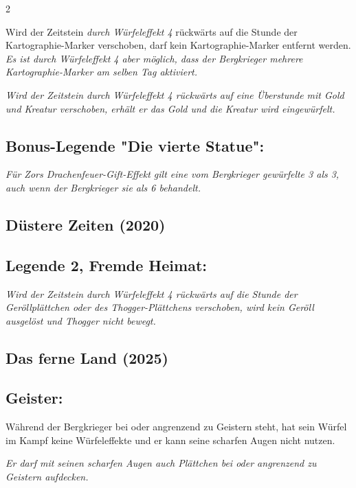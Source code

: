 \documentclass[10pt, a4paper, oneside]{book}
\newcommand{\fan}[1]{\textit{#1}}
\begin{document}
\begin{multicols*}{2}
\begin{bgcolor}[color-AG]
Wird der Zeitstein \fan{durch Würfeleffekt 4} rückwärts auf die Stunde der Kartographie-Marker verschoben, darf kein Kartographie-Marker entfernt werden. 
\supercite{AG:Begleitheft}
\fan{Es ist durch Würfeleffekt 4 aber möglich, dass der Bergkrieger mehrere Kartographie-Marker am selben Tag aktiviert.}

\fan{Wird der Zeitstein durch Würfeleffekt 4 rückwärts auf eine Überstunde mit Gold und Kreatur verschoben, erhält er das Gold und die Kreatur wird eingewürfelt.}


\subsection{Bonus-Legende "Die vierte Statue":}

\fan{Für Zors Drachenfeuer-Gift-Effekt gilt eine vom Bergkrieger gewürfelte 3 als 3, auch wenn der Bergkrieger sie als 6 behandelt.}

\end{bgcolor}




\columnbreak




\begin{bgcolor}[color-DZ]
\section{Düstere Zeiten (2020)}

\subsection{Legende 2, Fremde Heimat:}

\fan{Wird der Zeitstein durch Würfeleffekt 4 rückwärts auf die Stunde der Geröllplättchen oder des Thogger-Plättchens verschoben, wird kein Geröll ausgelöst und Thogger nicht bewegt.}

\end{bgcolor}



\begin{bgcolor}
\section{Das ferne Land (2025)}




\subsection{Geister:}

Während der Bergkrieger bei oder angrenzend zu Geistern steht, hat sein Würfel im Kampf keine Würfeleffekte und er kann seine scharfen Augen nicht nutzen.

\fan{Er darf mit seinen scharfen Augen auch Plättchen bei oder angrenzend zu Geistern aufdecken.}

\end{bgcolor}




\end{multicols*}
\end{document}
